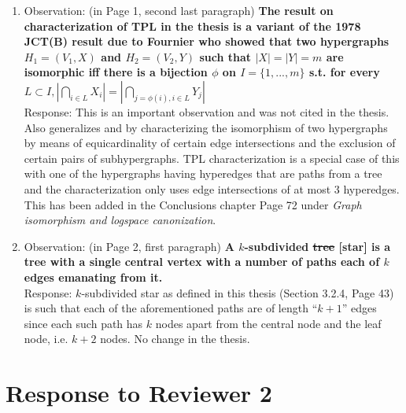 \documentclass[12pt,a4paper]{article}
\begin{document}
\begin{enumerate}
\item Observation: (in Page 1, second last paragraph) {\bf The result
    on characterization of TPL in the thesis is a variant of the 1978
    JCT(B) result due to Fournier who showed that two hypergraphs $H_1
    = (V_1, X)$ and $H_2 = (V_2, Y)$ such that $|X| = |Y| = m$ are
    isomorphic iff there is a bijection $\phi$ on $I = \{1, ... , m\}$
    s.t. for every $L \subset I,
    |\bigcap_{i \in L}X_i| = |\bigcap_{j=\phi(i),i \in L}Y_j|$} \\
  Response: This is an important observation and was not cited in the
  thesis. Also \cite{f80} generalizes \cite{br72} and \cite{fg65} by
  characterizing the isomorphism of two hypergraphs by means of
  equicardinality of certain edge intersections and the exclusion of
  certain pairs of subhypergraphs. TPL characterization is a special
  case of this with one of the hypergraphs having hyperedges that are
  paths from a tree and the characterization only uses edge
  intersections of at most 3 hyperedges. This has been added in the
  Conclusions chapter Page 72 under {\em Graph isomorphism and
    logspace canonization}.

\item Observation: (in Page 2, first paragraph) {\bf A $k$-subdivided
    \sout{tree} [star] is a tree with a single central vertex with a number of paths
    each of $k$ edges emanating from it.}\\
  Response: $k$-subdivided star as defined in this thesis (Section 3.2.4,
  Page 43) is such that each of the aforementioned paths are of length
  ``$k+1$'' edges since each such path has $k$ nodes apart from the
  central node and the leaf node, i.e.  $k+2$ nodes. No change in the
  thesis.
\end{enumerate}


\section{Response to Reviewer 2}
\end{document}
